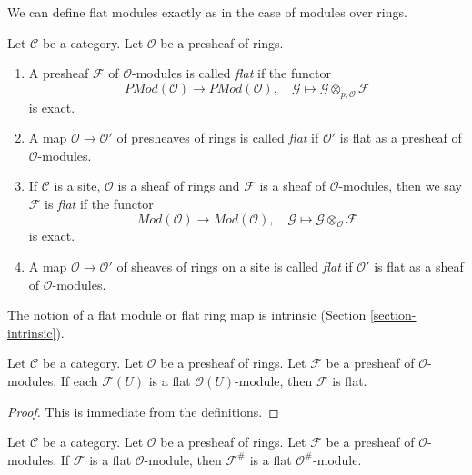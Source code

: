 \noindent
We can define flat modules exactly as in the case of modules over rings.

\begin{definition}
\label{definition-flat}
Let $\mathcal{C}$ be a category.
Let $\mathcal{O}$ be a presheaf of rings.
\begin{enumerate}
\item A presheaf $\mathcal{F}$ of $\mathcal{O}$-modules is called
{\it flat} if the functor
$$
\textit{PMod}(\mathcal{O})
\longrightarrow
\textit{PMod}(\mathcal{O}), \quad
\mathcal{G} \mapsto \mathcal{G} \otimes_{p, \mathcal{O}} \mathcal{F}
$$
is exact.
\item A map $\mathcal{O} \to \mathcal{O}'$ of presheaves of rings
is called {\it flat} if $\mathcal{O}'$ is flat as a presheaf of
$\mathcal{O}$-modules.
\item If $\mathcal{C}$ is a site, $\mathcal{O}$ is a sheaf of rings
and $\mathcal{F}$ is a sheaf of $\mathcal{O}$-modules, then we
say $\mathcal{F}$ is {\it flat} if the functor
$$
\textit{Mod}(\mathcal{O})
\longrightarrow
\textit{Mod}(\mathcal{O}), \quad
\mathcal{G} \mapsto \mathcal{G} \otimes_{\mathcal{O}} \mathcal{F}
$$
is exact.
\item A map $\mathcal{O} \to \mathcal{O}'$ of sheaves of rings on a site
is called {\it flat} if $\mathcal{O}'$ is flat as a sheaf of
$\mathcal{O}$-modules.
\end{enumerate}
\end{definition}

\noindent
The notion of a flat module or flat ring map is intrinsic
(Section \ref{section-intrinsic}).

\begin{lemma}
\label{lemma-flatness-presheaves}
Let $\mathcal{C}$ be a category.
Let $\mathcal{O}$ be a presheaf of rings.
Let $\mathcal{F}$ be a presheaf of $\mathcal{O}$-modules.
If each $\mathcal{F}(U)$ is a flat $\mathcal{O}(U)$-module,
then $\mathcal{F}$ is flat.
\end{lemma}

\begin{proof}
This is immediate from the definitions.
\end{proof}

\begin{lemma}
\label{lemma-flatness-sheafification}
Let $\mathcal{C}$ be a category.
Let $\mathcal{O}$ be a presheaf of rings.
Let $\mathcal{F}$ be a presheaf of $\mathcal{O}$-modules.
If $\mathcal{F}$ is a flat $\mathcal{O}$-module, then
$\mathcal{F}^\#$ is a flat $\mathcal{O}^\#$-module.
\end{lemma}

